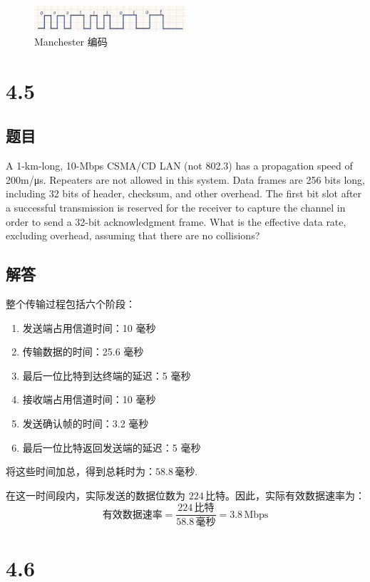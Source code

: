 \begin{figure}[H]
    \centering
    \includegraphics[width=0.5\textwidth]{lec4/manchester.png}
    \caption{Manchester 编码}
    \label{fig:manchester}
\end{figure}

\section{4.5}

\subsection*{题目}
A 1-km-long, 10-Mbps CSMA/CD LAN (not 802.3) has a propagation speed of 200m/μs. Repeaters are not allowed in this system. Data frames are 256 bits long, including 32 bits of header, checksum, and other overhead. The first bit slot after a successful transmission is reserved for the receiver to capture the channel in order to send a 32-bit acknowledgment frame. What is the effective data rate, excluding overhead, assuming that there are no collisions?

\subsection*{解答}
整个传输过程包括六个阶段：
\begin{enumerate}
    \item 发送端占用信道时间：10 毫秒
    \item 传输数据的时间：25.6 毫秒
    \item 最后一位比特到达终端的延迟：5 毫秒
    \item 接收端占用信道时间：10 毫秒
    \item 发送确认帧的时间：3.2 毫秒
    \item 最后一位比特返回发送端的延迟：5 毫秒
\end{enumerate}

将这些时间加总，得到总耗时为：$ 58.8 \, \text{毫秒} $.

在这一时间段内，实际发送的数据位数为 \(224 \, \text{比特}\)。因此，实际有效数据速率为：
\[
\text{有效数据速率} = \frac{224 \, \text{比特}}{58.8 \, \text{毫秒}} = 3.8 \, \text{Mbps}
\]

\section{4.6}

